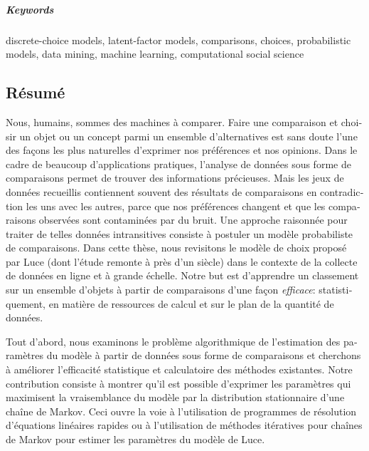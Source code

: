 \paragraph{Keywords}
discrete-choice models, latent-factor models, comparisons, choices, probabilistic models, data mining, machine learning, computational social science

\cleardoublepage

\begin{otherlanguage}{french}
	\chapter*{Résumé}

	Nous, humains, sommes des machines à comparer.
	Faire une comparaison et choisir un objet ou un concept parmi un ensemble d'alternatives est sans doute l'une des façons les plus naturelles d'exprimer nos préférences et nos opinions.
	Dans le cadre de beaucoup d'applications pratiques, l'analyse de données sous forme de comparaisons permet de trouver des informations précieuses.
	Mais les jeux de données recueillis contiennent souvent des résultats de comparaisons en contradiction les uns avec les autres, parce que nos préférences changent et que les comparaisons observées sont contaminées par du bruit.
	Une approche raisonnée pour traiter de telles données intransitives consiste à postuler un modèle probabiliste de comparaisons.
	Dans cette thèse, nous revisitons le modèle de choix proposé par Luce (dont l'étude remonte à près d'un siècle) dans le contexte de la collecte de données en ligne et à grande échelle.
	Notre but est d'apprendre un classement sur un ensemble d'objets à partir de comparaisons d'une façon \emph{efficace}: statistiquement, en matière de ressources de calcul et sur le plan de la quantité de données.

	Tout d'abord, nous examinons le problème algorithmique de l'estimation des paramètres du modèle à partir de données sous forme de comparaisons et cherchons à améliorer l'efficacité statistique et calculatoire des méthodes existantes.
	Notre contribution consiste à montrer qu'il est possible d'exprimer les paramètres qui maximisent la vraisemblance du modèle par la distribution stationnaire d'une chaîne de Markov.
	Ceci ouvre la voie à l'utilisation de programmes de résolution d'équations linéaires rapides ou à l'utilisation de méthodes itératives pour chaînes de Markov pour estimer les paramètres du modèle de Luce.


\end{otherlanguage}
